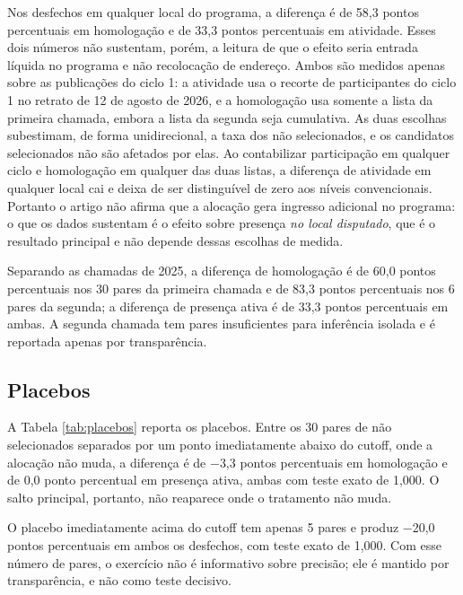 \documentclass[11pt,a4paper]{article}
\begin{document}
Nos desfechos em qualquer local do programa, a diferença é de 58,3 pontos
percentuais em homologação e de 33,3 pontos percentuais em atividade. Esses dois
números não sustentam, porém, a leitura de que o efeito seria entrada líquida no
programa e não recolocação de endereço. Ambos são medidos apenas sobre as
publicações do ciclo 1: a atividade usa o recorte de participantes do ciclo 1 no
retrato de 12 de agosto de 2026, e a homologação usa somente a lista da primeira
chamada, embora a lista da segunda seja cumulativa. As duas escolhas subestimam,
de forma unidirecional, a taxa dos não selecionados, e os candidatos selecionados
não são afetados por elas. Ao contabilizar participação em qualquer ciclo e
homologação em qualquer das duas listas, a diferença de atividade em qualquer
local cai e deixa de ser distinguível de zero aos níveis convencionais. Portanto
o artigo não afirma que a alocação gera ingresso adicional no programa: o que os
dados sustentam é o efeito sobre presença \emph{no local disputado}, que é o
resultado principal e não depende dessas escolhas de medida.

Separando as chamadas de 2025, a diferença de homologação é de 60,0 pontos
percentuais nos 30 pares da primeira chamada e de 83,3 pontos percentuais nos 6
pares da segunda; a diferença de presença ativa é de 33,3 pontos percentuais em
ambas. A segunda chamada tem pares insuficientes para inferência isolada e é
reportada apenas por transparência.

\subsection{Placebos}

A Tabela \ref{tab:placebos} reporta os placebos. Entre os 30 pares de não
selecionados separados por um ponto imediatamente abaixo do cutoff, onde a
alocação não muda, a diferença é de $-$3,3 pontos percentuais em homologação e
de 0,0 ponto percentual em presença ativa, ambas com teste exato de 1,000. O
salto principal, portanto, não reaparece onde o tratamento não muda.

O placebo imediatamente acima do cutoff tem apenas 5 pares e produz $-$20,0
pontos percentuais em ambos os desfechos, com teste exato de 1,000. Com esse
número de pares, o exercício não é informativo sobre precisão; ele é mantido por
transparência, e não como teste decisivo.
\end{document}
